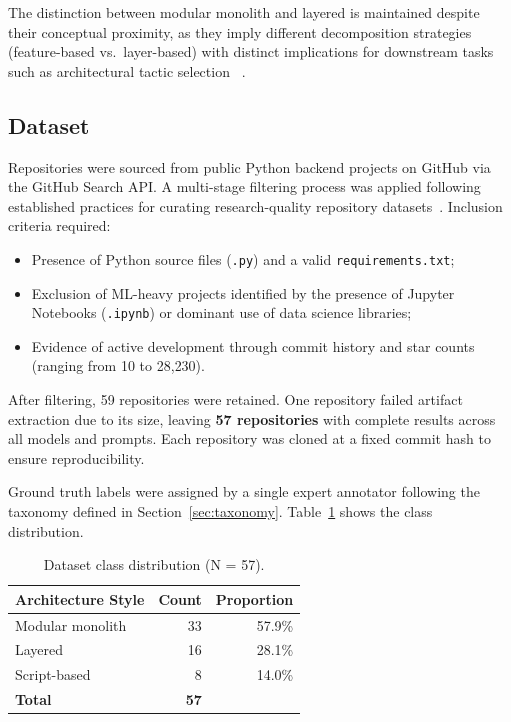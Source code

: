 \documentclass[runningheads]{llncs}
\begin{document}
The distinction between modular monolith and layered is maintained despite their conceptual proximity, as they imply different decomposition strategies (feature-based vs.\ layer-based) with distinct implications for downstream tasks such as architectural tactic selection~\cite{bass2021software} \cite{marquez2022architectural}.

\subsection{Dataset}
\label{sec:dataset}

Repositories were sourced from public Python backend projects on GitHub via the GitHub Search API. A multi-stage filtering process was applied following established practices for curating research-quality repository datasets~\cite{rahmati2021ensuring}. Inclusion criteria required:

\begin{itemize}[nosep]
    \item Presence of Python source files (\texttt{.py}) and a valid \texttt{requirements.txt};
    \item Exclusion of ML-heavy projects identified by the presence of Jupyter Notebooks (\texttt{.ipynb}) or dominant use of data science libraries;
    \item Evidence of active development through commit history and star counts (ranging from 10 to 28{,}230).
\end{itemize}

After filtering, 59 repositories were retained. One repository failed artifact extraction due to its size, leaving \textbf{57 repositories} with complete results across all models and prompts. Each repository was cloned at a fixed commit hash to ensure reproducibility.

Ground truth labels were assigned by a single expert annotator following the taxonomy defined in Section~\ref{sec:taxonomy}. Table~\ref{tab:class_dist} shows the class distribution.

\begin{table}[htbp]
\caption{Dataset class distribution (N = 57).}
\label{tab:class_dist}
\centering
\small
\begin{tabular}{lrr}
\toprule
\textbf{Architecture Style} & \textbf{Count} & \textbf{Proportion} \\
\midrule
Modular monolith & 33 & 57.9\% \\
Layered & 16 & 28.1\% \\
Script-based & 8 & 14.0\% \\
\midrule
\textbf{Total} & \textbf{57} & \\
\bottomrule
\end{tabular}
\end{table}
\end{document}
